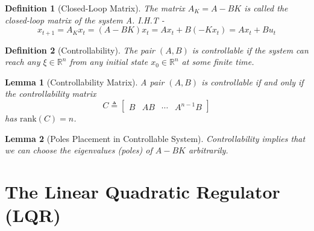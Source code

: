 \documentclass[a4 paper]{article}
\numberwithin{equation}{section}
\theoremstyle{boldStyle}
\theoremstyle{boldBlueStyle}
\newtheorem{lemma}{Lemma}[section]
\theoremstyle{boldPurpleStyle}
\theoremstyle{boldRedStyle}
\newtheorem{definition}{Definition}[section]
\begin{document}
\begin{definition}[Closed-Loop Matrix]
  The matrix $A_K = A - BK$ is called the closed-loop matrix of the system A. I.H.T -
  \[
    x_{t+1} = A_Kx_t = (A - BK)x_t = Ax_t + B(-Kx_t) = Ax_t + Bu_t
  \]
\end{definition}


\begin{definition}[Controllability]
  The pair \( (A, B) \) is \textit{controllable} if the system can reach any \( \xi \in \mathbb{R}^n \) from any initial state \( x_0 \in \mathbb{R}^n \) at some finite time.
\end{definition}

\begin{lemma}[Controllability Matrix]
  A pair \( (A, B) \) is controllable if and only if the \textit{controllability matrix}
  \[
  C \triangleq \begin{bmatrix} B & AB & \cdots & A^{n-1}B \end{bmatrix}
  \]
  has \( \text{rank}(C) = n \).
\end{lemma}


\begin{lemma}[Poles Placement in Controllable System]
  Controllability implies that we can choose the eigenvalues (poles) of \( A - BK \) arbitrarily.
\end{lemma}





\newpage
\section{The Linear Quadratic Regulator (LQR)}
\end{document}
